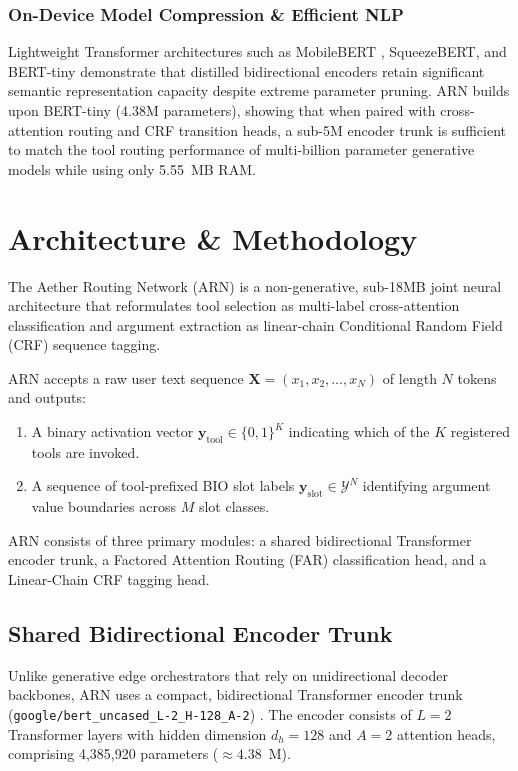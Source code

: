 \documentclass[letterpaper]{article} %
\begin{document}
\subsubsection{On-Device Model Compression \& Efficient NLP}
Lightweight Transformer architectures such as MobileBERT \citep{sun2020mobilebert}, SqueezeBERT, and BERT-tiny \citep{turc2019well} demonstrate that distilled bidirectional encoders retain significant semantic representation capacity despite extreme parameter pruning. ARN builds upon BERT-tiny (4.38M parameters), showing that when paired with cross-attention routing and CRF transition heads, a sub-5M encoder trunk is sufficient to match the tool routing performance of multi-billion parameter generative models while using only 5.55~MB RAM.


\section{Architecture \& Methodology}

The Aether Routing Network (ARN) is a non-generative, sub-18MB joint neural architecture that reformulates tool selection as multi-label cross-attention classification and argument extraction as linear-chain Conditional Random Field (CRF) sequence tagging.

ARN accepts a raw user text sequence $\mathbf{X} = (x_1, x_2, \dots, x_N)$ of length $N$ tokens and outputs:
\begin{enumerate}
    \item A binary activation vector $\mathbf{y}_{\text{tool}} \in \{0, 1\}^K$ indicating which of the $K$ registered tools are invoked.
    \item A sequence of tool-prefixed BIO slot labels $\mathbf{y}_{\text{slot}} \in \mathcal{Y}^N$ identifying argument value boundaries across $M$ slot classes.
\end{enumerate}
ARN consists of three primary modules: a shared bidirectional Transformer encoder trunk, a Factored Attention Routing (FAR) classification head, and a Linear-Chain CRF tagging head.

\subsection{Shared Bidirectional Encoder Trunk}
Unlike generative edge orchestrators that rely on unidirectional decoder backbones, ARN uses a compact, bidirectional Transformer encoder trunk (\texttt{google/bert\_uncased\_L-2\_H-128\_A-2}) \citep{devlin2019bert}. The encoder consists of $L=2$ Transformer layers with hidden dimension $d_h=128$ and $A=2$ attention heads, comprising 4,385,920 parameters ($\approx 4.38$~M).
\end{document}
